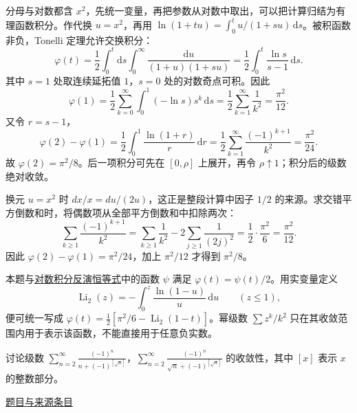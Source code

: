 \documentclass[UTF8,12pt,a4paper,fontset=fandol]{ctexart}
\begin{document}
\begin{solve}\label{ans:ch02-16th-A:2}

分母与对数都含 $x^2$，先统一变量，再把参数从对数中取出，可以把计算归结为有理函数积分。作代换 $u=x^2$，再用 $\ln(1+tu)=\int_0^t u/(1+su)\,\mathrm ds$。被积函数非负，Tonelli 定理允许交换积分：
\[
\varphi(t)=\frac12\int_0^t\!\mathrm ds
\int_0^\infty\frac{\mathrm du}{(1+u)(1+su)}
=\frac12\int_0^t\frac{\ln s}{s-1}\,\mathrm ds.
\]
其中 $s=1$ 处取连续延拓值 $1$，$s=0$ 处的对数奇点可积。因此
\[
\varphi(1)=\frac12\sum_{k=0}^\infty
\int_0^1(-\ln s)s^k\,\mathrm ds
=\frac12\sum_{k=1}^\infty\frac1{k^2}
=\frac{\pi^2}{12}.
\]
又令 $r=s-1$，
\[
\varphi(2)-\varphi(1)
=\frac12\int_0^1\frac{\ln(1+r)}r\,\mathrm dr
=\frac12\sum_{k=1}^\infty\frac{(-1)^{k+1}}{k^2}
=\frac{\pi^2}{24}.
\]
故 $\varphi(2)=\pi^2/8$。后一项积分可先在 $[0,\rho]$ 上展开，再令 $\rho\uparrow1$；积分后的级数绝对收敛。

换元 $u=x^2$ 时 $dx/x=du/(2u)$，这正是整段计算中因子 $1/2$ 的来源。求交错平方倒数和时，将偶数项从全部平方倒数和中扣除两次：
\[
\sum_{k\ge1}\frac{(-1)^{k+1}}{k^2}
=\sum_{k\ge1}\frac1{k^2}-2\sum_{j\ge1}\frac1{(2j)^2}
=\frac12\cdot\frac{\pi^2}{6}=\frac{\pi^2}{12}.
\]
因此 $\varphi(2)-\varphi(1)=\pi^2/24$，加上 $\pi^2/12$ 才得到 $\pi^2/8$。

\end{solve}

\begin{remark}[方法与条件]本题与\hyperref[pr:ch05-14th-A-makeup:6]{对数积分反演恒等式}中的函数 $\psi$ 满足 $\varphi(t)=\psi(t)/2$。用实变量定义
\[
\operatorname{Li}_2(z)=-\int_0^z\frac{\ln(1-u)}u\,\mathrm du\qquad(z\leq1),
\]
便可统一写成 $\varphi(t)=\tfrac12[\pi^2/6-\operatorname{Li}_2(1-t)]$。幂级数 $\sum z^k/k^2$ 只在其收敛范围内用于表示该函数，不能直接用于任意负实数。\end{remark}

\begin{example}[来源序号5]\label{ex:ch02-16th-A:5}\label{pr:ch02-16th-A:5}

讨论级数 $\sum_{n=2}^{\infty} \frac{(-1)^{n}}{n+(-1)^{[\sqrt{n}]}}$，$\sum_{n=2}^{\infty} \frac{(-1)^{n}}{\sqrt{n}+(-1)^{[\sqrt{n}]}}$ 的收敛性，其中 $[x]$ 表示 $x$ 的整数部分。

\par\href{https://github.com/lzxcr/cmc-mathematics/blob/64916fa1fdbc3e444a652eca204d5669058ee321/src/problems/preliminary/16/05.md}{题目与来源条目}

\end{example}
\end{document}
